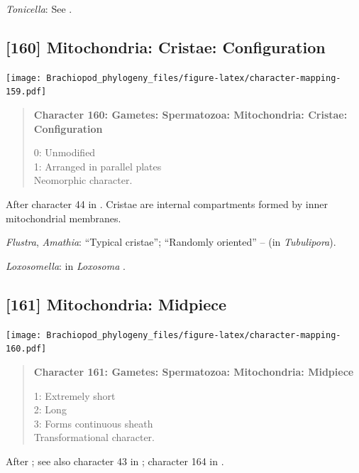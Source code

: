 \documentclass[openany]{book}
\begin{document}
\hypertarget{Tonicella-coding-159}{}
\emph{Tonicella}: See \citet{BucklandNicks1988}.

\subsection*{{[}160{]} Mitochondria: Cristae:
Configuration}\label{mitochondria-cristae-configuration}

\texttt{[image: Brachiopod\_phylogeny\_files/figure-latex/character-mapping-159.pdf]}

\begin{quote}
\textbf{Character 160: Gametes: Spermatozoa: Mitochondria: Cristae:
Configuration}

0: Unmodified\\
1: Arranged in parallel plates\\
Neomorphic character.
\end{quote}

After character 44 in \citet{Ponder1997}. Cristae are internal
compartments formed by inner mitochondrial membranes.

\hypertarget{Amathia-coding-160}{}
\emph{Flustra}, \emph{Amathia}: ``Typical cristae''; ``Randomly
oriented'' -- \citet{Franzen1984} (in \emph{Tubulipora}).

\hypertarget{Loxosomella-coding-160}{}
\emph{Loxosomella}: in \emph{Loxosoma} \citep{Franzen2000}.

\subsection*{{[}161{]} Mitochondria:
Midpiece}\label{mitochondria-midpiece}

\texttt{[image: Brachiopod\_phylogeny\_files/figure-latex/character-mapping-160.pdf]}

\begin{quote}
\textbf{Character 161: Gametes: Spermatozoa: Mitochondria: Midpiece}

1: Extremely short\\
2: Long\\
3: Forms continuous sheath\\
Transformational character.
\end{quote}

After \citet{Smith2012}; see also character 43 in \citet{Ponder1997};
character 164 in \citet{Giribet2002}.
\end{document}

